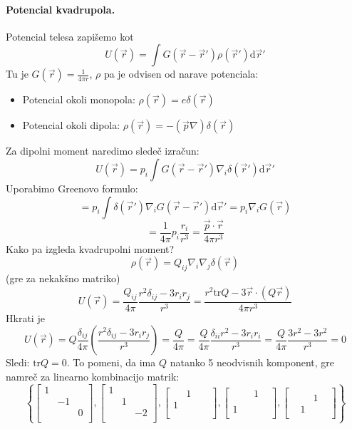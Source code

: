 \documentclass[a4paper]{article}
\newcommand{\vct}[1]{\overrightarrow{#1}}
\newcommand{\dif}{\mathrm{d}}
\begin{document}
\paragraph{Potencial kvadrupola.} Potencial telesa zapišemo kot
$$U(\vct{r}) = \int G(\vct{r} - \vct{r}')\rho(\vct{r}')\dif\vct{r}'$$
Tu je $\displaystyle{G(\vct{r}) = \frac{1}{4\pi r}}$, $\rho$ pa je odvisen od narave potenciala:
\begin{itemize}
    \item Potencial okoli monopola: $\rho(\vct{r}) = e\delta(\vct{r})$
    \item Potencial okoli dipola: $\rho(\vct{r}) = -(\vct{p}\nabla)\delta(\vct{r})$
\end{itemize}
Za dipolni moment naredimo sledeč izračun:
$$U(\vct{r}) = p_i \int G(\vct{r} - \vct{r}')\nabla_i\delta(\vct{r}') \dif\vct{r}'$$
Uporabimo Greenovo formulo:
$$= p_i\int \delta(\vct{r}')\nabla_iG(\vct{r} - \vct{r}')\dif\vct{r}' = p_i\nabla_iG(\vct{r})$$
$$= \frac{1}{4\pi} p_i \frac{r_i}{r^3} = \frac{\vct{p}\cdot\vct{r}}{4\pi r^3}$$
Kako pa izgleda kvadrupolni moment?
$$\rho(\vct{r}) = Q_{ij} \nabla_i\nabla_j\delta(\vct{r})$$
(gre za nekakšno matriko)
$$U(\vct{r}) = \frac{Q_{ij}}{4\pi} \frac{r^2\delta_{ij} - 3r_ir_j}{r^3} = \frac{r^2 \text{tr}Q - 3\vct{r}\cdot(Q\vct{r})}{4\pi r^3}$$
Hkrati je $$U(\vct{r}) = Q\frac{\delta_{ij}}{4\pi} \left(\frac{r^2\delta_{ij} - 3r_ir_j}{r^3}\right) = \frac{Q}{4\pi} = \frac{Q}{4\pi} \frac{\delta_{ii} r^2 - 3r_{i}r_{i}}{r^3} = \frac{Q}{4\pi}\frac{3r^2 - 3r^2}{r^3} = 0$$
Sledi: $\displaystyle{\text{tr}Q = 0}$. To pomeni, da ima $Q$ natanko 5 neodvisnih komponent, gre namreč za linearno kombinacijo matrik:
$$\left\{
    \begin{bmatrix}
        1&& \\
        &-1& \\
        &&0 \\
    \end{bmatrix},
    \begin{bmatrix}
        1&& \\
        &1& \\
        &&-2 \\
    \end{bmatrix},
    \begin{bmatrix}
        &1& \\
        1&& \\
        &&& \\
    \end{bmatrix},
    \begin{bmatrix}
        &&1 \\
        &&& \\
        1&& \\
    \end{bmatrix},
    \begin{bmatrix}
        &&& \\
        &&1 \\
        &1& \\
    \end{bmatrix}
\right\}$$
\end{document}
